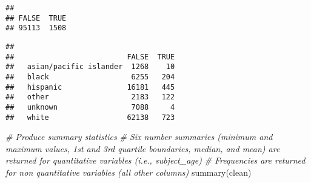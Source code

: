 \documentclass[
]{article}
\newenvironment{Shaded}{\begin{snugshade}}{\end{snugshade}}
\newcommand{\CommentTok}[1]{\textcolor[rgb]{0.56,0.35,0.01}{\textit{#1}}}
\newcommand{\FunctionTok}[1]{\textcolor[rgb]{0.00,0.00,0.00}{#1}}
\newcommand{\NormalTok}[1]{#1}
\newcommand{\SpecialCharTok}[1]{\textcolor[rgb]{0.00,0.00,0.00}{#1}}
\begin{document}
\begin{Shaded}
\end{Shaded}

\begin{verbatim}
## 
## FALSE  TRUE 
## 95113  1508
\end{verbatim}

\begin{Shaded}
\end{Shaded}

\begin{verbatim}
##                         
##                          FALSE  TRUE
##   asian/pacific islander  1268    10
##   black                   6255   204
##   hispanic               16181   445
##   other                   2183   122
##   unknown                 7088     4
##   white                  62138   723
\end{verbatim}

\begin{Shaded}
\begin{Highlighting}[]
\CommentTok{\# Produce summary statistics}
\CommentTok{\# Six number summaries (minimum and maximum values, 1st and 3rd quartile boundaries, median, and mean) are returned for quantitative variables (i.e., subject\_age)}
\CommentTok{\# Frequencies are returned for non quantitative variables (all other columns)}
\FunctionTok{summary}\NormalTok{(clean)}
\end{Highlighting}
\end{Shaded}
\end{document}
